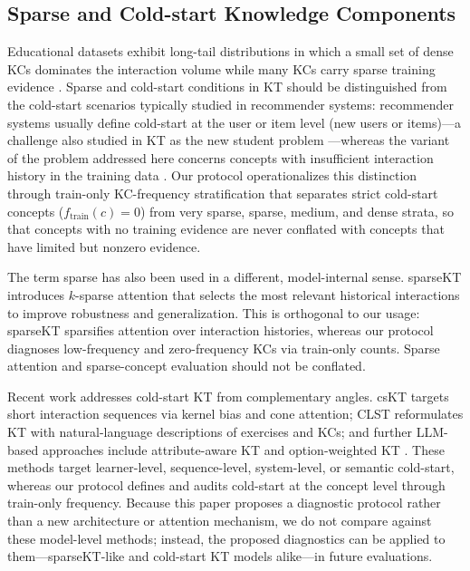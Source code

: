 \subsection{Sparse and Cold-start Knowledge Components}
Educational datasets exhibit long-tail distributions in which a small set of dense KCs dominates the interaction volume while many KCs carry sparse training evidence \citep{choi2020ednet,liu2023xes3g5m}. Sparse and cold-start conditions in KT should be distinguished from the cold-start scenarios typically studied in recommender systems: recommender systems usually define cold-start at the user or item level (new users or items)---a challenge also studied in KT as the new student problem \citep{bhattacharjee2025coldstart}---whereas the variant of the problem addressed here concerns concepts with insufficient interaction history in the training data \citep{pelanek2015memory,choffin2019das3h}. Our protocol operationalizes this distinction through train-only KC-frequency stratification that separates strict cold-start concepts ($f_{\mathrm{train}}(c) = 0$) from very sparse, sparse, medium, and dense strata, so that concepts with no training evidence are never conflated with concepts that have limited but nonzero evidence.

The term sparse has also been used in a different, model-internal sense. sparseKT \citep{huang2023sparsekt} introduces $k$-sparse attention that selects the most relevant historical interactions to improve robustness and generalization. This is orthogonal to our usage: sparseKT sparsifies attention over interaction histories, whereas our protocol diagnoses low-frequency and zero-frequency KCs via train-only counts. Sparse attention and sparse-concept evaluation should not be conflated.

Recent work addresses cold-start KT from complementary angles. csKT \citep{bai2025cskt} targets short interaction sequences via kernel bias and cone attention; CLST \citep{jung2025clst} reformulates KT with natural-language descriptions of exercises and KCs; and further LLM-based approaches include attribute-aware KT \citep{guo2024mitigating} and option-weighted KT \citep{kim2024beyond}. These methods target learner-level, sequence-level, system-level, or semantic cold-start, whereas our protocol defines and audits cold-start at the concept level through train-only frequency. Because this paper proposes a diagnostic protocol rather than a new architecture or attention mechanism, we do not compare against these model-level methods; instead, the proposed diagnostics can be applied to them---sparseKT-like and cold-start KT models alike---in future evaluations.

